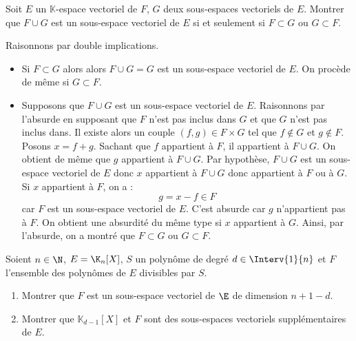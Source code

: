 \documentclass[a4paper,twoside,french,11pt]{VcCours}
\begin{document}
\begin{Exercice}{} Soit $E$ un $\mathbb{K}$-espace vectoriel de $F$, $G$ deux sous-espaces vectoriels de $E$. Montrer que $F \cup G$ est un sous-espace vectoriel de $E$ si et seulement si $F \subset G$ ou $G \subset F$.
\end{Exercice}

\corr Raisonnons par double implications.

\begin{itemize}
\item Si $F \subset G$ alors alors $F \cup G = G$ est un sous-espace vectoriel de $E$. On procède de même si $G \subset F$.
\item Supposons que $F \cup G$ est un sous-espace vectoriel de $E$. Raisonnons par l'absurde en supposant que $F$ n'est pas inclus dans $G$ et que $G$ n'est pas inclus dans. Il existe alors un couple $(f,g) \in F \times G$ tel que $f \notin G$ et $g \notin F$. Posons $x=f+g$. Sachant que $f$ appartient à $F$, il appartient à $F \cup G$. On obtient de même que $g$ appartient à $F \cup G$. Par hypothèse, $F \cup G$ est un sous-espace vectoriel de $E$ donc $x$ appartient à $F \cup G$ donc appartient à $F$ ou à $G$. Si $x$ appartient à $F$, on a :
$$ g = x-f \in F$$
car $F$ est un sous-espace vectoriel de $E$. C'est absurde car $g$ n'appartient pas à $F$. On obtient une absurdité du même type si $x$ appartient à $G$. Ainsi, par l'absurde, on a montré que $F \subset G$ ou $G \subset F$. 
\end{itemize}

\begin{Exercice}{} Soient $n\in\N$, $E=\K_n[X]$, $S$ un polynôme de degré $d \in \Interv{1}{n}$ et $F$ l'ensemble des polynômes de $E$ divisibles par $S$.
\begin{enumerate}
	\item Montrer que $F$ est un sous-espace vectoriel de $\E$ de dimension $n+1-d$.
	\item Montrer que $\mathbb{K}_{d-1}[X]$  et $F$ sont des sous-espaces vectoriels supplémentaires de $E$.
\end{enumerate} 
\end{Exercice}
\end{document}
